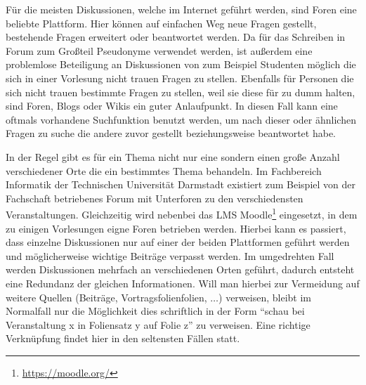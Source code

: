 \medskip

Für die meisten Diskussionen, welche im Internet geführt werden, sind Foren eine beliebte Plattform. Hier können auf einfachen Weg neue Fragen gestellt, bestehende Fragen erweitert oder beantwortet werden. Da für das Schreiben in Forum zum Großteil Pseudonyme verwendet werden, ist außerdem eine problemlose Beteiligung an Diskussionen von zum Beispiel Studenten möglich die sich in einer Vorlesung nicht trauen Fragen zu stellen. Ebenfalls für Personen die sich nicht trauen bestimmte Fragen zu stellen, weil sie diese für zu dumm halten, sind Foren, Blogs oder Wikis ein guter Anlaufpunkt. In diesen Fall kann eine oftmals vorhandene Suchfunktion benutzt werden,  um nach dieser oder ähnlichen Fragen zu suche die andere zuvor gestellt beziehungsweise beantwortet habe.

\medskip


In der Regel gibt es für ein Thema nicht nur eine sondern einen große Anzahl verschiedener Orte die ein bestimmtes Thema behandeln. Im Fachbereich Informatik der Technischen Universität Darmstadt existiert zum Beispiel von der Fachschaft betriebenes Forum mit Unterforen zu den verschiedensten Veranstaltungen. Gleichzeitig wird nebenbei das LMS Moodle\footnote{\url{https://moodle.org/}} eingesetzt, in dem zu einigen Vorlesungen eigne Foren betrieben werden. Hierbei kann es passiert, dass einzelne Diskussionen nur auf einer der beiden Plattformen geführt werden und möglicherweise wichtige Beiträge verpasst werden. Im umgedrehten Fall werden Diskussionen mehrfach an verschiedenen Orten geführt, dadurch entsteht eine Redundanz der gleichen Informationen. Will man hierbei zur Vermeidung auf weitere Quellen (Beiträge, Vortragsfolienfolien, $ \dots $) verweisen, bleibt im Normalfall nur die Möglichkeit dies schriftlich in der Form \enquote{schau bei Veranstaltung x in Foliensatz y auf Folie z} zu verweisen. Eine richtige Verknüpfung findet hier in den seltensten Fällen statt. 





